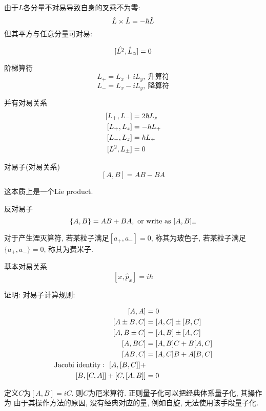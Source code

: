 \documentclass[UTF8]{ctexart}
\numberwithin{equation}{subsection}
\newcommand{\nts}[1]{
    \begin{center}
        \begin{notices}{}{}
            #1
        \end{notices}
    \end{center}
}
\newcommand{\ntswd}[1]{
    \begin{center}
        \begin{noticeswd}{}{}
            #1
        \end{noticeswd}
    \end{center}
}
\begin{document}
由于$L$各分量不对易导致自身的叉乘不为零:
$$\hat{L}\times\hat{L}=-\hbar\hat{L}$$
但其平方与任意分量可对易:
\nts{$$[\hat{L^2},\hat{L}_\alpha]=0$$}
\begin{defi}{阶梯算符}{}
$$L_+=L_x+iL_y,\ \text{升算符}$$
$$L_-=L_x-iL_y,\ \text{降算符}$$
\end{defi}
并有对易关系
$$\ar{
    [L_+,L_-] \x 2\hbar L_z\\
    [L_+,L_z]\x-\hbar L_+\\
    [L_-,L_z]\x \hbar L_+\\
    [L^2,L_\pm]\x0
}$$
\begin{defi}{对易子(对易关系)}{}
$$[A,B]=AB-BA$$
\end{defi}
这本质上是一个Lie product. 
\begin{defi}{反对易子}{}
$$\{A,B\}=AB+BA,\ {\rm or\ write\ as\ } [A,B]_+$$
\end{defi}
对于产生湮灭算符, 若某粒子满足$[a_+,a_-]=0$, 称其为玻色子, 若某粒子满足$\{a_+,a_-\}=0$, 称其为费米子. \\
\begin{defi}{基本对易关系}{}
    $$[x,\hat{p}_x]=i\hbar$$ 
\end{defi}
    证明:
对易子计算规则:
\ntswd{$$\ar{
    [A,A] \x 0\\
    [A\pm B,C]\x[A,C]\pm[B,C]\\
    [A,B\pm C]\x[A,B]\pm[A,C]\\
    [A,BC]\x [A,B]C+B[A,C]\\
    [AB,C]\x[A,C]B+A[B,C]\\
    {\rm Jacobi\ identity}:\ [A,[B,C]]+&\\
    [B,[C,A]]+[C,[A,B]]\x0
}$$}
定义$C$为$[A,B]=iC$. 则$C$为厄米算符. 
正则量子化可以把经典体系量子化, 其操作为
由于其操作方法的原因, 没有经典对应的量, 例如自旋, 无法使用该手段量子化. \\
\end{document}
